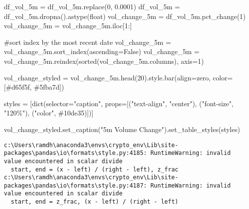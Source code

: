 \documentclass[
  letterpaper,
  DIV=11,
  numbers=noendperiod]{scrartcl}
\newenvironment{Shaded}{\begin{snugshade}}{\end{snugshade}}
\newcommand{\BuiltInTok}[1]{\textcolor[rgb]{0.00,0.23,0.31}{#1}}
\newcommand{\CommentTok}[1]{\textcolor[rgb]{0.37,0.37,0.37}{#1}}
\newcommand{\DecValTok}[1]{\textcolor[rgb]{0.68,0.00,0.00}{#1}}
\newcommand{\FloatTok}[1]{\textcolor[rgb]{0.68,0.00,0.00}{#1}}
\newcommand{\NormalTok}[1]{\textcolor[rgb]{0.00,0.23,0.31}{#1}}
\newcommand{\OperatorTok}[1]{\textcolor[rgb]{0.37,0.37,0.37}{#1}}
\newcommand{\StringTok}[1]{\textcolor[rgb]{0.13,0.47,0.30}{#1}}
\newcommand{\VariableTok}[1]{\textcolor[rgb]{0.07,0.07,0.07}{#1}}
\begin{document}
\begin{Shaded}
\begin{Highlighting}[]
\NormalTok{df\_vol\_5m }\OperatorTok{=}\NormalTok{ df\_vol\_5m.replace(}\DecValTok{0}\NormalTok{, }\FloatTok{0.0001}\NormalTok{)}
\NormalTok{df\_vol\_5m }\OperatorTok{=}\NormalTok{ df\_vol\_5m.dropna().astype(}\BuiltInTok{float}\NormalTok{)}
\NormalTok{vol\_change\_5m }\OperatorTok{=}\NormalTok{ df\_vol\_5m.pct\_change(}\DecValTok{1}\NormalTok{)}
\NormalTok{vol\_change\_5m }\OperatorTok{=}\NormalTok{ vol\_change\_5m.iloc[}\DecValTok{1}\NormalTok{:]}

\CommentTok{\#sort index by the most recent date}
\NormalTok{vol\_change\_5m }\OperatorTok{=}\NormalTok{ vol\_change\_5m.sort\_index(ascending}\OperatorTok{=}\VariableTok{False}\NormalTok{)}
\NormalTok{vol\_change\_5m }\OperatorTok{=}\NormalTok{ vol\_change\_5m.reindex(}\BuiltInTok{sorted}\NormalTok{(vol\_change\_5m.columns), axis}\OperatorTok{=}\DecValTok{1}\NormalTok{)}


\NormalTok{vol\_change\_styled }\OperatorTok{=}\NormalTok{ vol\_change\_5m.head(}\DecValTok{20}\NormalTok{).style.bar(align}\OperatorTok{=}\StringTok{\textquotesingle{}zero\textquotesingle{}}\NormalTok{, color}\OperatorTok{=}\NormalTok{[}\StringTok{\textquotesingle{}\#d65f5f\textquotesingle{}}\NormalTok{, }\StringTok{\textquotesingle{}\#5fba7d\textquotesingle{}}\NormalTok{])}

\NormalTok{styles }\OperatorTok{=}\NormalTok{ [}\BuiltInTok{dict}\NormalTok{(selector}\OperatorTok{=}\StringTok{"caption"}\NormalTok{,}
\NormalTok{            props}\OperatorTok{=}\NormalTok{[(}\StringTok{"text{-}align"}\NormalTok{, }\StringTok{"center"}\NormalTok{),}
\NormalTok{                   (}\StringTok{"font{-}size"}\NormalTok{, }\StringTok{"120\%"}\NormalTok{),}
\NormalTok{                   (}\StringTok{"color"}\NormalTok{, }\StringTok{\textquotesingle{}\#10de35\textquotesingle{}}\NormalTok{)])]}

\NormalTok{vol\_change\_styled.set\_caption(}\StringTok{"5m Volume Change"}\NormalTok{).set\_table\_styles(styles)}
\end{Highlighting}
\end{Shaded}

\begin{verbatim}
c:\Users\ramdh\anaconda3\envs\crypto_env\Lib\site-packages\pandas\io\formats\style.py:4185: RuntimeWarning: invalid value encountered in scalar divide
  start, end = (x - left) / (right - left), z_frac
c:\Users\ramdh\anaconda3\envs\crypto_env\Lib\site-packages\pandas\io\formats\style.py:4187: RuntimeWarning: invalid value encountered in scalar divide
  start, end = z_frac, (x - left) / (right - left)
\end{verbatim}
\end{document}
